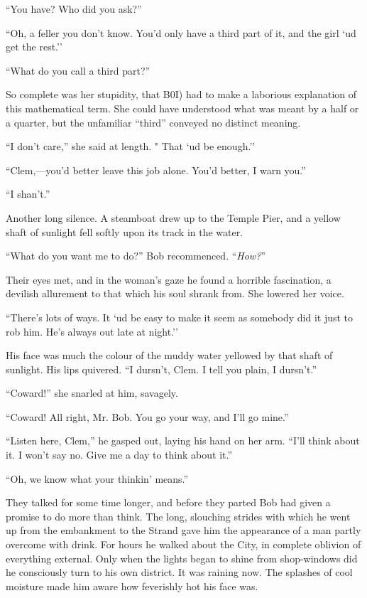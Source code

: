 ``You have? Who did you ask?''

``Oh, a feller you don't know. You'd only have a third part of it, and
the girl `ud get the rest.''

``What do you call a third part?''

So complete was her stupidity, that B0I) had to make a laborious
explanation of this mathematical term. She could have understood what
was meant by a half or a quarter, but the unfamiliar ``third'' conveyed
no distinct meaning.

``I don't care,'' she said at length. " That `ud be enough.''

``Clem,---you'd better leave this job alone. You'd better, I warn you.''

``I shan't.''

Another long silence. A steamboat drew up to the Temple Pier, and a
yellow shaft of sunlight fell softly upon its track in the water.

``What do you want me to do?'' Bob recommenced. ``\emph{How?}''

Their eyes met, and in the woman's gaze he {}found a horrible
fascination, a devilish allurement to that which his soul shrank from.
She lowered her voice.

``There's lots of ways. It `ud be easy to make it seem as somebody did
it just to rob him. He's always out late at night.''

His face was much the colour of the muddy water yellowed by that shaft
of sunlight. His lips quivered. ``I dursn't, Clem. I tell you plain, I
dursn't.''

``Coward!'' she snarled at him, savagely.

``Coward! All right, Mr. Bob. You go your way, and I'll go mine.''

``Listen here, Clem,'' he gasped out, laying his hand on her arm. ``I'll
think about it. I won't say no. Give me a day to think about it.''

``Oh, we know what your thinkin' means.''

They talked for some time longer, and before they parted Bob had given a
promise to do more than think. The long, slouching strides with which he
went up from the embankment to the Strand gave him the appearance of a
man partly overcome with drink. For hours he walked about the City, in
complete oblivion of {}everything external. Only when the lights began
to shine from shop-windows did he consciously turn to his own district.
It was raining now. The splashes of cool moisture made him aware how
feverishly hot his face was.

